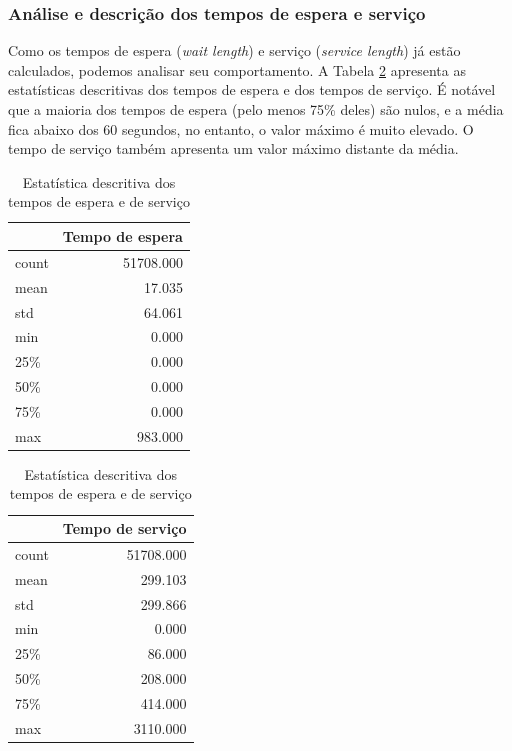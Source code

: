 \subsubsection{Análise e descrição dos tempos de espera e serviço}
Como os tempos de espera (\textit{wait length}) e serviço (\textit{service length}) já estão calculados, podemos analisar seu comportamento. A Tabela \ref*{tab: descricao-serviço-espera} apresenta as estatísticas descritivas dos tempos de espera e dos tempos de serviço. É notável que a maioria dos tempos de espera (pelo menos 75\% deles) são nulos, e a média fica abaixo dos 60 segundos, no entanto, o valor máximo é muito elevado. O tempo de serviço também apresenta um valor máximo distante da média.

\begin{table}[H]
\centering
    \begin{tabular}{lr}
            \toprule
            {} &  Tempo de espera \\
            \midrule
            count &   51708.000  \\
            mean  &      17.035  \\
            std   &      64.061  \\
            min   &       0.000  \\
            25\%   &       0.000  \\
            50\%   &       0.000  \\
            75\%   &       0.000  \\
            max   &     983.000  \\
        \bottomrule
    \end{tabular}
    \quad
    \begin{tabular}{lr}
            \toprule
            {} &  Tempo de serviço \\
            \midrule
            count &     51708.000   \\
            mean  &       299.103   \\
            std   &       299.866   \\
            min   &         0.000   \\
            25\%   &        86.000   \\
            50\%   &       208.000   \\
            75\%   &       414.000   \\
            max   &      3110.000   \\
        \bottomrule
    \end{tabular}
    \caption{Estatística descritiva dos tempos de espera e de serviço}
    \label{tab: descricao-serviço-espera}
\end{table}

